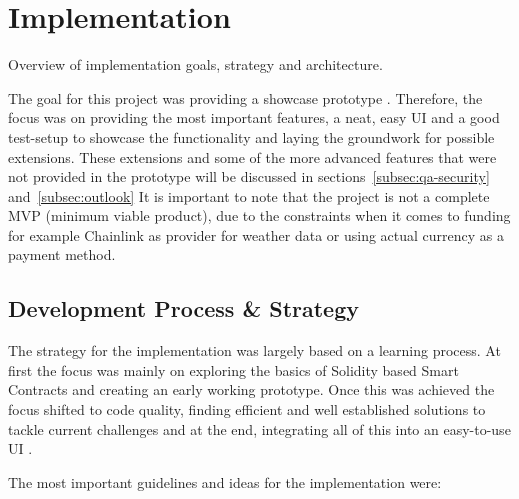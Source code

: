 \documentclass[11pt,a4paper]{article}
\begin{document}
    \section{Implementation}\label{sec:implementation}
    Overview of implementation goals, strategy and architecture.

    The goal for this project was providing a showcase prototype .
    Therefore, the focus was on providing the most important features, a neat, easy UI and a good test-setup to showcase the functionality and laying the groundwork for possible extensions.
    These extensions and some of the more advanced features that were not provided in the prototype will be discussed in sections~\ref{subsec:qa-security} and~\ref{subsec:outlook}
    It is important to note that the project is not a complete MVP (minimum viable product), due to the constraints when it comes to funding for example Chainlink as provider for weather data or using actual currency as a payment method.

    \subsection{Development Process \& Strategy}\label{subsec:dev-strategy}
    The strategy for the implementation was largely based on a learning process.
    At first the focus was mainly on exploring the basics of Solidity based Smart Contracts and creating an early working prototype.
    Once this was achieved the focus shifted to code quality, finding efficient and well established solutions to tackle current challenges and at the end, integrating all of this into an easy-to-use UI .


    The most important guidelines and ideas for the implementation were:
\end{document}
